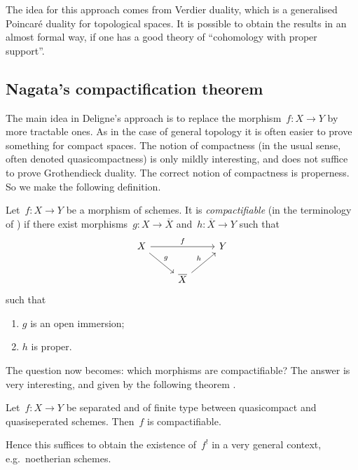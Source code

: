 The idea for this approach comes from Verdier duality, which is a generalised Poincar\'e duality for topological spaces. It is possible to obtain the results in an almost formal way, if one has a good theory of ``cohomology with proper support''.

\subsection{Nagata's compactification theorem}
The main idea in Deligne's approach is to replace the morphism~$f\colon X\to Y$ by more tractable ones. As in the case of general topology it is often easier to prove something for compact spaces. The notion of compactness (in the usual sense, often denoted quasicompactness) is only mildly interesting, and does not suffice to prove Grothendieck duality. The correct notion of compactness is properness. So we make the following definition.
\begin{definition}
  Let~$f\colon X\to Y$ be a morphism of schemes. It is \emph{compactifiable} (in the terminology of \cite[appendix]{hartshorne-residues-and-duality}) if there exist morphisms~$g\colon X\to\overline{X}$ and~$h\colon\overline{X}\to Y$ such that
  \begin{equation}
    \begin{tikzcd}
      X \arrow{rr}{f} \arrow{rd}{g} & & Y \\
      & \overline{X} \arrow{ur}{h}
    \end{tikzcd}
  \end{equation}
  such that
  \begin{enumerate}
    \item $g$ is an open immersion;
    \item $h$ is proper.
  \end{enumerate}
\end{definition}
The question now becomes: which morphisms are compactifiable? The answer is very interesting, and given by the following theorem \cite{nagata-imbedding,nagata-generalization-imbedding,conrad-delignes-notes-nagata-compactification}.
\begin{theorem}
  \label{theorem:nagata}
  Let~$f\colon X\to Y$ be separated and of finite type between quasicompact and quasiseperated schemes. Then~$f$ is compactifiable.
\end{theorem}
Hence this suffices to obtain the existence of~$f^!$ in a very general context, e.g.\ noetherian schemes.

